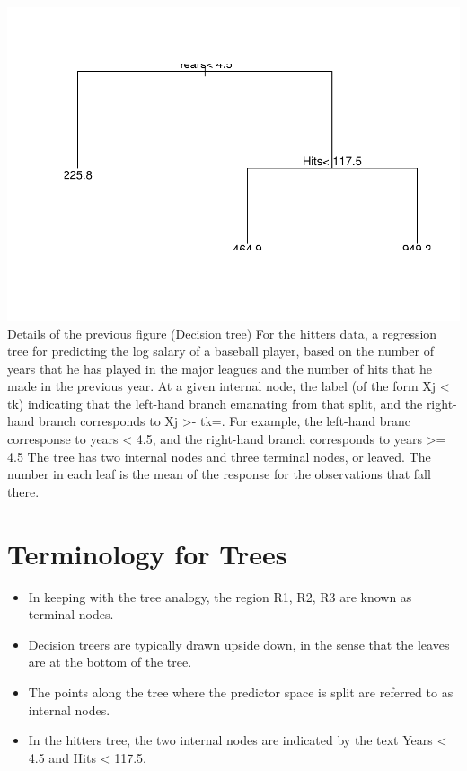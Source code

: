 \documentclass[]{report}
\providecommand{\tightlist}{%
  \setlength{\itemsep}{0pt}\setlength{\parskip}{0pt}}
\begin{document}
\includegraphics{MyBook_files/figure-latex/unnamed-chunk-145-1.pdf}
Details of the previous figure (Decision tree) For the hitters data, a
regression tree for predicting the log salary of a baseball player,
based on the number of years that he has played in the major leagues and
the number of hits that he made in the previous year. At a given
internal node, the label (of the form Xj \textless{} tk) indicating that
the left-hand branch emanating from that split, and the right-hand
branch corresponds to Xj \textgreater{}- tk=. For example, the left-hand
branc corresponse to years \textless{} 4.5, and the right-hand branch
corresponds to years \textgreater{}= 4.5 The tree has two internal nodes
and three terminal nodes, or leaved. The number in each leaf is the mean
of the response for the observations that fall there.

\section{Terminology for Trees}\label{terminology-for-trees}

\begin{itemize}
\tightlist
\item
  In keeping with the tree analogy, the region R1, R2, R3 are known as
  terminal nodes.
\item
  Decision treers are typically drawn upside down, in the sense that the
  leaves are at the bottom of the tree.
\item
  The points along the tree where the predictor space is split are
  referred to as internal nodes.
\item
  In the hitters tree, the two internal nodes are indicated by the text
  Years \textless{} 4.5 and Hits \textless{} 117.5.
\end{itemize}
\end{document}
